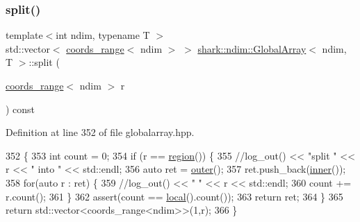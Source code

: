 \subsubsection{\texorpdfstring{split()}{split()}}
{\footnotesize\ttfamily template$<$int ndim, typename T $>$ \\
std\+::vector$<$ \hyperlink{structshark_1_1ndim_1_1coords__range}{coords\+\_\+range}$<$ ndim $>$ $>$ \hyperlink{classshark_1_1ndim_1_1_global_array}{shark\+::ndim\+::\+Global\+Array}$<$ ndim, T $>$\+::split (\begin{DoxyParamCaption}\item[{\hyperlink{structshark_1_1ndim_1_1coords__range}{coords\+\_\+range}$<$ ndim $>$}]{r }\end{DoxyParamCaption}) const\hspace{0.3cm}{\ttfamily [inline]}}



Definition at line 352 of file globalarray.\+hpp.


\begin{DoxyCode}
352                                                                                                           \{
353                     \textcolor{keywordtype}{int} count = 0;
354                     \textcolor{keywordflow}{if} (r == \hyperlink{classshark_1_1ndim_1_1_global_array_a40939e7384b55a49b59c63dc717224d2}{region}()) \{
355                         \textcolor{comment}{//log\_out() << "split " << r << " into " << std::endl;}
356                         \textcolor{keyword}{auto} ret = \hyperlink{classshark_1_1ndim_1_1_global_array_a93f43e778ca040cb2ca8ad05dcb02ab0}{outer}();
357                         ret.push\_back(\hyperlink{classshark_1_1ndim_1_1_global_array_a9bba546920e1709b492540d4ef0b0129}{inner}());
358                         \textcolor{keywordflow}{for}(\textcolor{keyword}{auto} r : ret) \{
359                             \textcolor{comment}{//log\_out() << " " << r << std::endl;}
360                             count += r.count();
361                         \}
362                         assert(count == \hyperlink{classshark_1_1ndim_1_1_global_array_a871fb1acbd9bd46439766121053e20d1}{local}().count());
363                         \textcolor{keywordflow}{return} ret;
364                     \}
365                     \textcolor{keywordflow}{return} std::vector<coords\_range<ndim>>(1,r);
366                 \}
\end{DoxyCode}
\hypertarget{classshark_1_1ndim_1_1_global_array_a27631077480a0cda76b968d6b21f0da4}{}\label{classshark_1_1ndim_1_1_global_array_a27631077480a0cda76b968d6b21f0da4} 
